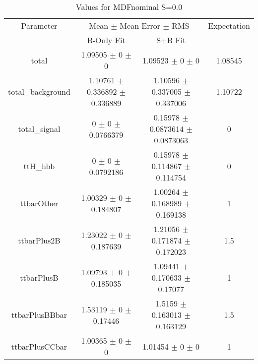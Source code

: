 \begin{table}
\centering
\caption{Values for MDFnominal S=0.0}
\begin{tabular}{cccc}
\toprule
Parameter & \multicolumn{2}{c}{Mean $\pm$ Mean Error $\pm$ RMS} & Expectation\\
 & B-Only Fit & S+B Fit & \\
\midrule
total & \num{1.09505} $\pm$ \num{0} $\pm$ \num{0} & \num{1.09523} $\pm$ \num{0} $\pm$ \num{0} & \num{1.08545}\\
total\_background & \num{1.10761} $\pm$ \num{0.336892} $\pm$ \num{0.336889} & \num{1.10596} $\pm$ \num{0.337005} $\pm$ \num{0.337006} & \num{1.10722}\\
total\_signal & \num{0} $\pm$ \num{0} $\pm$ \num{0.0766379} & \num{0.15978} $\pm$ \num{0.0873614} $\pm$ \num{0.0873063} & \num{0}\\
ttH\_hbb & \num{0} $\pm$ \num{0} $\pm$ \num{0.0792186} & \num{0.15978} $\pm$ \num{0.114867} $\pm$ \num{0.114754} & \num{0}\\
ttbarOther & \num{1.00329} $\pm$ \num{0} $\pm$ \num{0.184807} & \num{1.00264} $\pm$ \num{0.168989} $\pm$ \num{0.169138} & \num{1}\\
ttbarPlus2B & \num{1.23022} $\pm$ \num{0} $\pm$ \num{0.187639} & \num{1.21056} $\pm$ \num{0.171874} $\pm$ \num{0.172023} & \num{1.5}\\
ttbarPlusB & \num{1.09793} $\pm$ \num{0} $\pm$ \num{0.185035} & \num{1.09441} $\pm$ \num{0.170633} $\pm$ \num{0.17077} & \num{1}\\
ttbarPlusBBbar & \num{1.53119} $\pm$ \num{0} $\pm$ \num{0.17446} & \num{1.5159} $\pm$ \num{0.163013} $\pm$ \num{0.163129} & \num{1.5}\\
ttbarPlusCCbar & \num{1.00365} $\pm$ \num{0} $\pm$ \num{0} & \num{1.01454} $\pm$ \num{0} $\pm$ \num{0} & \num{1}\\
\bottomrule
\end{tabular}
\end{table}